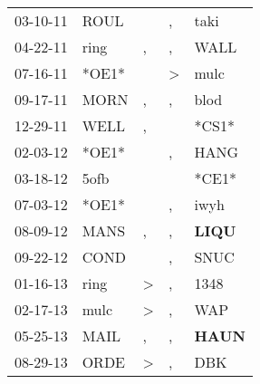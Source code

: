 \begin{supertabular}{p{0.07\textwidth}p{0.06\textwidth}p{0.02\textwidth}p{0.02\textwidth}p{0.06\textwidth}}
          03-10-11\textsuperscript{} &           ROUL\textsuperscript{} &                  &                , &           taki\textsuperscript{} \\
          04-22-11\textsuperscript{} &           ring\textsuperscript{} &                , &                , &           WALL\textsuperscript{} \\
          07-16-11\textsuperscript{} &                            *OE1* &                  &     \textgreater &           mulc\textsuperscript{} \\
          09-17-11\textsuperscript{} &           MORN\textsuperscript{} &                , &                , &           blod\textsuperscript{} \\
          12-29-11\textsuperscript{} &           WELL\textsuperscript{} &                , &                  &                            *CS1* \\
          02-03-12\textsuperscript{} &                            *OE1* &                  &                , &           HANG\textsuperscript{} \\
          03-18-12\textsuperscript{} &           5ofb\textsuperscript{} &                  &                  &                            *CE1* \\
          07-03-12\textsuperscript{} &                            *OE1* &                  &                , &           iwyh\textsuperscript{} \\
          08-09-12\textsuperscript{} &           MANS\textsuperscript{} &                , &                , &  \textbf{LIQU\textsuperscript{}} \\
          09-22-12\textsuperscript{} &           COND\textsuperscript{} &                  &                , &           SNUC\textsuperscript{} \\
          01-16-13\textsuperscript{} &           ring\textsuperscript{} &     \textgreater &                , &           1348\textsuperscript{} \\
          02-17-13\textsuperscript{} &           mulc\textsuperscript{} &     \textgreater &                , &            WAP\textsuperscript{} \\
          05-25-13\textsuperscript{} &           MAIL\textsuperscript{} &                , &                , &  \textbf{HAUN\textsuperscript{}} \\
          08-29-13\textsuperscript{} &           ORDE\textsuperscript{} &     \textgreater &                , &            DBK\textsuperscript{} \\

\end{supertabular}
